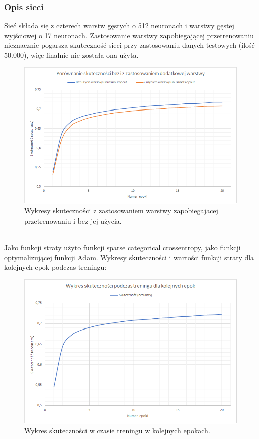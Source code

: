 \documentclass[letterpaper,12pt]{article} %
\begin{document}
\subsubsection*{Opis sieci}
Sieć składa się z czterech warstw gęstych o 512 neuronach i warstwy gęstej wyjściowej o 17 neuronach. Zastosowanie warstwy zapobiegającej przetrenowaniu nieznacznie pogarsza skuteczność sieci przy zastosowaniu danych testowych (ilość 50.000), 
więc finalnie nie została ona użyta. 
\begin{figure}[h]
    \centering
    \includegraphics[scale=0.85]{gaussian.png}
    \caption{Wykresy skuteczności z zastosowaniem warstwy zapobiegajacej przetrenowaniu i bez jej użycia.}
\end{figure} \\
Jako funkcji straty użyto funkcji sparse categorical crossentropy, jako funkcji optymalizującej funkcji Adam. Wykresy skuteczności i wartości funkcji straty dla kolejnych epok podczas treningu:
\begin{figure}[h]
    \centering
    \includegraphics[scale=0.6]{skutecznosc.png}
    \caption{Wykres skuteczności w czasie treningu w kolejnych epokach.}
\end{figure} \\
\end{document}
